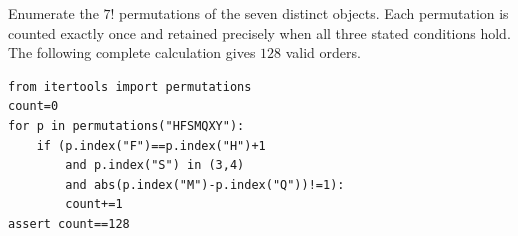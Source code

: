 Enumerate the $7!$ permutations of the seven distinct objects. Each permutation is counted exactly once and retained precisely when all three stated conditions hold. The following complete calculation gives $\boxed{128}$ valid orders.\begin{verbatim}
from itertools import permutations
count=0
for p in permutations("HFSMQXY"):
    if (p.index("F")==p.index("H")+1
        and p.index("S") in (3,4)
        and abs(p.index("M")-p.index("Q"))!=1):
        count+=1
assert count==128
\end{verbatim}
